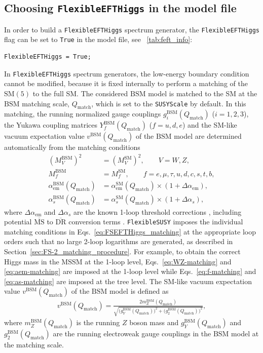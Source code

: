 \documentclass[final,3p,11pt,pdflatex]{elsarticle}
\makeatletter
\newcommand{\fs}{\texttt{FlexibleSUSY}\@\xspace}
\newcommand{\feft}{\texttt{Flex\-ib\-le\-EFT\-Higgs}\@\xspace}
\newcommand{\code}[1]{\lstinline|#1|}  %
\newcommand{\ol}[1]{\overline{#1}}
\newcommand{\MSbar}{\ensuremath{\ol{\text{MS}}}\xspace}
\newcommand{\DRbar}{\ensuremath{\ol{\text{DR}}}\xspace}
\newcommand{\SM}{\ensuremath{\text{SM}}\xspace}
\newcommand{\BSM}{\ensuremath{\text{BSM}}\xspace}
\newcommand{\Qmatch}{\ensuremath{Q_\text{match}}}
\newcommand{\secref}[1]{Section~\ref{#1}}
\newcommand{\tabref}[1]{\tablename~\ref{#1}}
\def\as{\alpha_s}
\def\aem{\alpha_{\text{em}}}
\makeatother
\begin{document}
\subsection{Choosing \feft in the model file}

In order to build a \feft spectrum generator, the
\code{FlexibleEFTHiggs} flag can be set to \code{True} in the model
file, see \tabref{tab:feft_info}:
%
\begin{lstlisting}
FlexibleEFTHiggs = True;
\end{lstlisting}
%
In \feft spectrum generators, the low-energy boundary condition cannot
be modified, because it is fixed internally to perform a matching of
the $\SM(5)$ to the full SM\@.  The considered \BSM model is
matched to the SM at the \BSM matching scale, $\Qmatch$,
which is set to the \code{SUSYScale} by default.  In this matching,
the running normalized gauge couplings $g_i^\BSM(\Qmatch)$
($i=1,2,3$), the Yukawa coupling matrices $Y_f^\BSM(\Qmatch)$
($f=u,d,e$) and the SM-like vacuum expectation value $v^\BSM(\Qmatch)$
of the \BSM model are determined automatically from the matching
conditions
%
\begin{subequations}
\begin{align}
  (M_V^\BSM)^2 &= (M_V^\SM)^2, \qquad V = W, Z,
  \label{eq:WZ-matching} \\
  M_f^\BSM &= M_f^\SM, \qquad f = e, \mu, \tau, u, d, c, s, t, b,
  \label{eq:f-matching} \\
  \aem^\BSM(\Qmatch) &= \aem^\SM(\Qmatch)\times (1 + \Delta\aem),
  \label{eq:aem-matching} \\
  \as^\BSM(\Qmatch) &= \as^\SM(\Qmatch)\times (1 + \Delta\as),
  \label{eq:as-matching}
\end{align}%
\label{eq:FSEFTHiggs_matching}%
\end{subequations}%
%
where $\Delta\aem$ and $\Delta\as$ are the known 1-loop
threshold corrections \cite{Hall:1980kf}, including potential \MSbar
to \DRbar conversion terms \cite{Martin:1993yx}.
\fs imposes the individual matching conditions in
Eqs.~\eqref{eq:FSEFTHiggs_matching} at the appropriate loop orders
such that no large 2-loop logarithms are generated, as
described in \secref{sec:FS-2_matching_procedure}.  For example, to
obtain the correct Higgs mass in the MSSM at the 1-loop level,
Eqs.~\eqref{eq:WZ-matching} and \eqref{eq:aem-matching} are imposed at
the 1-loop level while Eqs.~\eqref{eq:f-matching} and
\eqref{eq:as-matching} are imposed at the tree level.  The SM-like
vacuum expectation value $v^\BSM(\Qmatch)$ of the \BSM model is
defined as
%
\begin{align}
  v^\BSM(\Qmatch) = \frac{2 m_Z^\BSM(\Qmatch)}{\sqrt{\big(g_Y^\BSM(\Qmatch)\big)^2 + \big(g_2^\BSM(\Qmatch)\big)^2}},
  \label{eq:feft_vev_definition}
\end{align}
%
where $m_Z^\BSM(\Qmatch)$ is the running $Z$ boson mass and
$g_Y^\BSM(\Qmatch)$ and $g_2^\BSM(\Qmatch)$ are the running
electroweak gauge couplings in the \BSM model at the matching scale.
\end{document}
